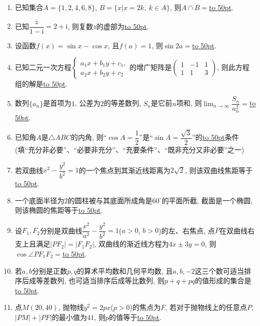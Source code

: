 \documentclass[10pt,a4paper]{article}
\newcommand{\blank}[1]{\underline{\hbox to #1pt{}}}
\begin{document}
\begin{enumerate}[1.]
\item 已知集合$A=\{1,2,4,6,8\}$, $B=\{x|x=2k, \ k\in A\}$, 则$A\cap B=$\blank{50}.
\item 已知$\dfrac{\overline z}{1-\mathrm{i}}=2+\mathrm{i}$, 则复数$z$的虚部为\blank{50}.
\item 设函数$f(x)=\sin x-\cos x$, 且$f(a)=1$, 则$\sin 2a=$\blank{50}.
\item 已知二元一次方程$\begin{cases} a_1x+b_1y+c_1, \\ a_2x+b_2y+c_2 \end{cases}$的增广矩阵是$\begin{pmatrix} 1 & -1 & 1 \\ 1 & 1 & 3\end{pmatrix}$, 则此方程组的解是\blank{50}.
\item 数列$\{a_n\}$是首项为$1$, 公差为$2$的等差数列, $S_n$是它前$n$项和, 则$\displaystyle\lim_{n\to\infty}\dfrac{S_n}{a_n^2}=$\blank{50}.
\item 已知角$A$是$\triangle ABC$的内角, 则``$\cos A=\dfrac 12$''是``$\sin A=\dfrac {\sqrt 3}2$''的\blank{50}条件(填``充分非必要''、``必要非充分''、``充要条件''、``既非充分又非必要''之一)
\item 若双曲线$x^2-\dfrac{y^2}{b^2}=1$的一个焦点到其渐近线距离为$2\sqrt{2}$, 则该双曲线焦距等于\blank{50}.
\item 一个底面半径为$2$的圆柱被与其底面所成角是$60^\circ$的平面所截, 截面是一个椭圆, 则该椭圆的焦距等于\blank{50}.
\begin{center}
\end{center}
\item 设$F_1,F_2$分别是双曲线$\dfrac{x^2}{a^2}-\dfrac{y^2}{b^2}=1$($a>0$, $b>0$)的左、右焦点, 点$P$在双曲线右支上且满足$|PF_2|=|F_1F_2|$, 双曲线的渐近线方程为$4x\pm 3y=0$, 则$\cos \angle PF_1F_2=$\blank{50}.
\item 若$a,b$分别是正数$p,q$的算术平均数和几何平均数, 且$a,b,-2$这三个数可适当排序后成等差数列, 也可适当排序后成等比数列, 则$p+q+pq$的值形成的集合是\blank{50}.
\item 点$M(20,40)$, 抛物线$y^2=2px$($p>0$)的焦点为$F$, 若对于抛物线上的任意点$P$, $|PM|+|PF|$的最小值为$41$, 则$p$的值等于\blank{50}.

\end{enumerate}
\end{document}

